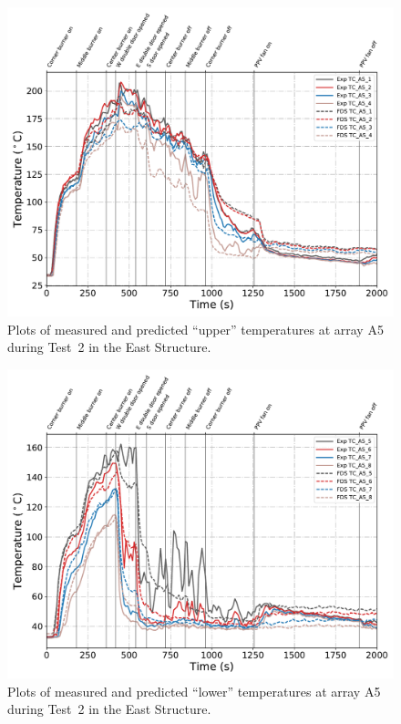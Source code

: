 \clearpage
\begin{figure}[p]
	\centering
	\includegraphics[width=\columnwidth]{Figures/Plots/Validation/Temperature/Test_2_TC_A5_upper}
	\caption{Plots of measured and predicted ``upper'' temperatures at array A5 during Test~2 in the East Structure.}
	\label{fig:TCA5_upper_data_Test2}
\end{figure}
\begin{figure}[p]
	\centering
	\includegraphics[width=\columnwidth]{Figures/Plots/Validation/Temperature/Test_2_TC_A5_lower}
	\caption{Plots of measured and predicted ``lower'' temperatures at array A5 during Test~2 in the East Structure.}
	\label{fig:TCA5_lower_data_Test2}
\end{figure}

